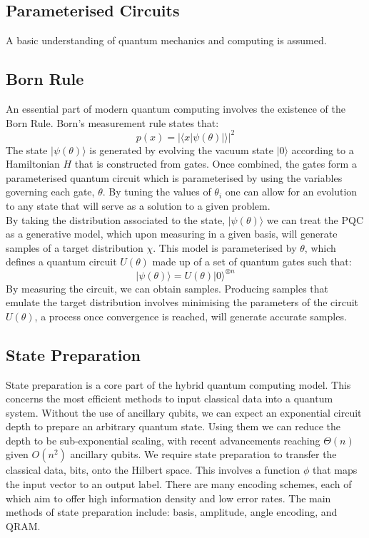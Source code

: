 \documentclass{article}
\numberwithin{equation}{section}
\begin{document}
\begin{Abstract}
\clearpage 
\section{Parameterised Circuits}
A basic understanding of quantum mechanics and computing is assumed. 
\subsection{Born Rule}
An essential part of modern quantum computing involves the existence of the Born
Rule. Born's measurement rule states that:
$$p(x) = |\langle x|\psi(\theta)|\rangle|^2$$
The state $|\psi(\theta)\rangle$ is generated by evolving the vacuum state $|0\rangle$
according to a Hamiltonian $H$ that is constructed from gates. Once combined, the 
gates form a parameterised quantum circuit which is parameterised by using the 
variables governing each gate, $\theta$. By tuning the values of $\theta_i$ one 
can allow for an evolution to any state that will serve as a solution to a given 
problem. \\ 
By taking the distribution associated to the state, $|\psi(\theta)\rangle$ we can 
treat the PQC as a generative model, which upon measuring in a given basis, will 
generate samples of a target distribution $\chi$. This model is parameterised 
by $\theta$, which defines a quantum circuit $U(\theta)$ made up of a set of quantum 
gates such that:
$$|\psi(\theta)\rangle = U(\theta)|0\rangle^{\otimes n}$$
By measuring the circuit, we can obtain samples. Producing samples that emulate 
the target distribution involves minimising the parameters of the circuit $U(\theta)$, 
a process once convergence is reached, will generate accurate samples. 
\cite{bornmachine} 

\subsection{State Preparation}
State preparation is a core part of the hybrid quantum computing model. This 
concerns the most efficient methods to input classical data into a quantum system. 
Without the use of ancillary qubits, we can expect an exponential circuit depth
to prepare an arbitrary quantum state. Using them we can reduce the depth to be 
sub-exponential scaling, with recent advancements reaching $\Theta(n)$ given $O(n^2)$
ancillary qubits.
\cite{stateprep1}
\cite{stateprep2}
We require state preparation to transfer the classical data, bits, onto the 
Hilbert space. This involves a function $\phi$ that maps the input vector to 
an output label. There are many encoding schemes, each of which aim to offer 
high information density and low error rates.
The main methods of state preparation include: basis, amplitude, angle encoding,
and QRAM. 


\end{Abstract}
\end{document}
